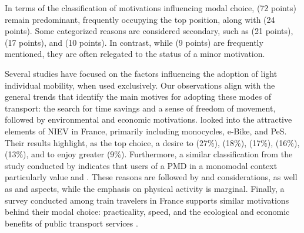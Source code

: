 \begin{refsegment}
In terms of the classification of motivations influencing modal choice,  (72 points) remain predominant, frequently occupying the top position, along with  (24 points). Some categorized reasons are considered secondary, such as  (21 points),  (17 points), and  (10 points). In contrast, while  (9 points) are frequently mentioned, they are often relegated to the status of a minor motivation.%

Several studies have focused on the factors influencing the adoption of light individual mobility, when used exclusively. Our observations align with the general trends that identify the main motives for adopting these modes of transport: the search for time savings and a sense of freedom of movement, followed by environmental and economic motivations. \textcolor{blue}{\textcite[16-17]{pages_nouveaux_2021}} looked into the attractive elements of \acrfull{NIEV} in France, primarily including monocycles, \acrshort{e-Bike}, and \acrshort{PeS}. Their results highlight, as the top choice, a desire to  (27\%),  (18\%),  (17\%),  (16\%),  (13\%), and to enjoy greater  (9\%). Furthermore, a similar classification from the study conducted by \textcolor{blue}{\textcite[15]{smart_mobility_lab_usages_2020}} indicates that users of a \acrfull{PMD} in a monomodal context particularly value  and . These reasons are followed by  and  considerations, as well as  and  aspects, while the emphasis on physical activity is marginal. Finally, a survey conducted among train travelers in France supports similar motivations behind their modal choice: practicality, speed, and the ecological and economic benefits of public transport services \textcolor{blue}{\autocite[24]{toluna_francais_2023}}.%


\end{refsegment}
